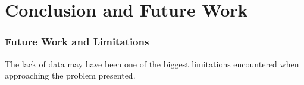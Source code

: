 \chapter{Conclusion and Future Work}
\subsection{Future Work and Limitations}
The lack of data may have been one of the biggest limitations encountered when approaching the
problem presented.